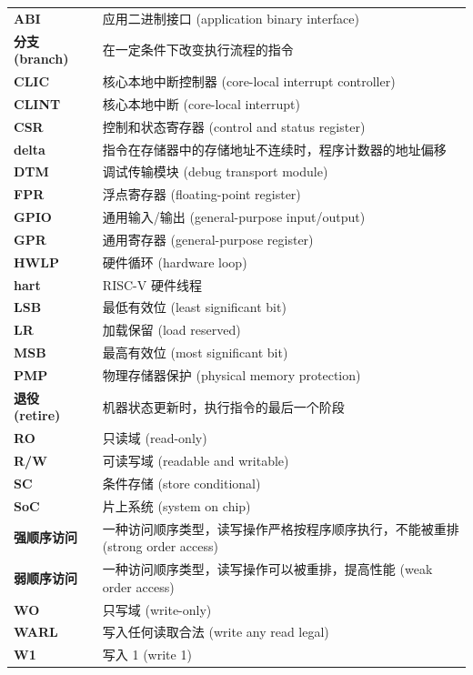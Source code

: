 \documentclass[main\_\_CN.tex]{subfiles}
\begin{document}
\begin{longtable}[c]{ R{2cm} p{12cm} }
\textbf{ABI} & 应用二进制接口 (application binary interface)\\
\textbf{分支 (branch)} & 在一定条件下改变执行流程的指令 \\
\textbf{CLIC} & 核心本地中断控制器 (core-local interrupt controller)\\
\textbf{CLINT} & 核心本地中断 (core-local interrupt)\\
\textbf{CSR} & 控制和状态寄存器 (control and status register)\\
\textbf{delta} & 指令在存储器中的存储地址不连续时，程序计数器的地址偏移 \\
\textbf{DTM} & 调试传输模块 (debug transport module) \\
\textbf{FPR} & 浮点寄存器 (floating-point register)\\
\textbf{GPIO} & 通用输入/输出 (general-purpose input/output)\\
\textbf{GPR} & 通用寄存器 (general-purpose register)\\
\textbf{HWLP} & 硬件循环 (hardware loop)\\
\textbf{hart} & RISC-V 硬件线程\\
\textbf{LSB} & 最低有效位 (least significant bit)\\
\textbf{LR} & 加载保留 (load reserved)\\
\textbf{MSB} & 最高有效位 (most significant bit)\\
\textbf{PMP} & 物理存储器保护 (physical memory protection)\\
\textbf{退役 (retire)} & 机器状态更新时，执行指令的最后一个阶段 \\
\textbf{RO} & 只读域 (read-only)\\
\textbf{R/W} & 可读写域 (readable and writable)\\
\textbf{SC} & 条件存储 (store conditional)\\
\textbf{SoC} & 片上系统 (system on chip)\\
\textbf{强顺序访问} & 一种访问顺序类型，读写操作严格按程序顺序执行，不能被重排 (strong order access) \\
\textbf{弱顺序访问} & 一种访问顺序类型，读写操作可以被重排，提高性能 (weak order access) \\
\textbf{WO} & 只写域 (write-only)\\
\textbf{WARL} & 写入任何读取合法 (write any read legal)\\
\textbf{W1} & 写入 1 (write 1)\\
\end{longtable}
\end{document}
